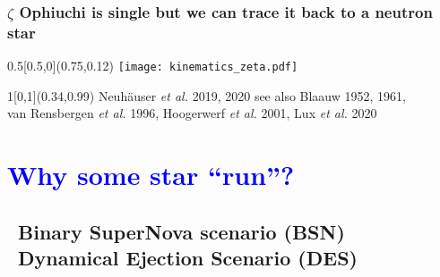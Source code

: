 \documentclass[xcolor=dvipsnames,professionalfonts, aspectratio=169]{beamer}
\begin{document}
\begin{frame}
  \frametitle{\textcolor{whiteish}{$\zeta$ Ophiuchi is single but we can trace it back to a neutron star}}

  \begin{textblock}{0.5}[0.5,0](0.75,0.12)
    \texttt{[image: kinematics\_zeta.pdf]}
  \end{textblock}




  \begin{textblock}{1}[0,1](0.34,0.99)
    \textcolor{gray!50}{\tiny Neuh\"auser \emph{et al.} 2019, 2020 see
      also Blaauw 1952, 1961,\\[-7pt]
      van Rensbergen \emph{et al.} 1996,
      Hoogerwerf \emph{et al.} 2001, Lux \emph{et al.} 2020}\hfill\,
  \end{textblock}

\end{frame}
\egroup



\section{\textcolor{Blue}{Why some star ``run''?}}
\subsection{\textcolor{gray!40}{\textbullet~Binary SuperNova scenario
  (BSN)} \\\textcolor{Blue}{\textbullet}~Dynamical Ejection Scenario (DES)}
\end{document}

